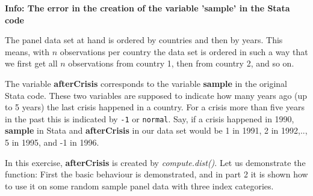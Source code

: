 \documentclass[a4paper,11pt,abstract=on]{scrartcl}
\newenvironment{infobox2}{}{}
\begin{document}
{\begin{infobox2}
\textbf{Info: The error in the creation of the variable 'sample' in the Stata code}\\
{\linespread{0.9}
The panel data set at hand is ordered by countries and then by years.
This means, with $n$ observations per country the data set is ordered in
such a way that we first get all $n$ observations from country 1, then
from country 2, and so on.

The variable \textbf{afterCrisis} corresponds to the variable
\textbf{sample} in the original Stata code. These two variables are
supposed to indicate how many years ago (up to 5 years) the last crisis
happened in a country. For a crisis more than five years in the past
this is indicated by \texttt{-1} or \texttt{normal}. Say, if a crisis
happened in 1990, \textbf{sample} in Stata and \textbf{afterCrisis} in
our data set would be 1 in 1991, 2 in 1992,.., 5 in 1995, and -1 in
1996.

In this exercise, \textbf{afterCrisis} is created by
\emph{compute.dist()}. Let us demonstrate the function: First the basic
behaviour is demonstrated, and in part 2 it is shown how to use it on
some random sample panel data with three index categories.
}


\end{infobox2}}
\end{document}
